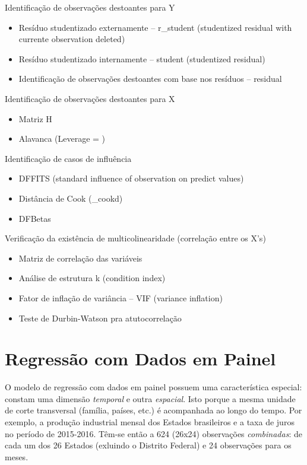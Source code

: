 \documentclass[12pt,brazil,oneside]{book}
\providecommand{\tightlist}{%
  \setlength{\itemsep}{0pt}\setlength{\parskip}{0pt}}
\begin{document}
Identificação de observações destoantes para Y

\begin{itemize}
\tightlist
\item
  Resíduo studentizado externamente -- r\_student (studentized residual
  with currente observation deleted)
\item
  Resíduo studentizado internamente -- student (studentized residual)
\item
  Identificação de observações destoantes com base nos resíduos --
  residual
\end{itemize}

Identificação de observações destoantes para X

\begin{itemize}
\tightlist
\item
  Matriz H
\item
  Alavanca (Leverage = )
\end{itemize}

Identificação de casos de influência

\begin{itemize}
\tightlist
\item
  DFFITS (standard influence of observation on predict values)
\item
  Distância de Cook (\_cookd)
\item
  DFBetas
\end{itemize}

Verificação da existência de multicolinearidade (correlação entre os
X's)

\begin{itemize}
\tightlist
\item
  Matriz de correlação das variáveis
\item
  Análise de estrutura k (condition index)
\item
  Fator de inflação de variância -- VIF (variance inflation)
\item
  Teste de Durbin-Watson pra atutocorrelação
\end{itemize}

\hypertarget{regressao-com-dados-em-painel}{%
\chapter{Regressão com Dados em
Painel}\label{regressao-com-dados-em-painel}}

O modelo de regressão com dados em painel possuem uma característica
especial: constam uma dimensão \emph{temporal} e outra \emph{espacial}.
Isto porque a mesma unidade de corte transversal (família, países, etc.)
é acompanhada ao longo do tempo. Por exemplo, a produção industrial
mensal dos Estados brasileiros e a taxa de juros no período de
2015-2016. Têm-se então a 624 (26x24) observações \emph{combinadas}: de
cada um dos 26 Estados (exluindo o Distrito Federal) e 24 observações
para os meses.
\end{document}
